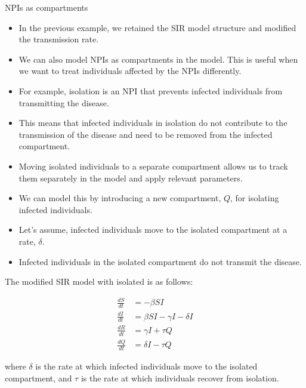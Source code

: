 \documentclass[
  ignorenonframetext,
]{beamer}
\begin{document}
\begin{frame}
\begin{block}{NPIs as compartments}
\label{npis-as-compartments}
\begin{itemize}
\item
  In the previous example, we retained the SIR model structure and
  modified the transmission rate.
\item
  We can also model NPIs as compartments in the model. This is useful
  when we want to treat individuals affected by the NPIs differently.
\end{itemize}
\end{block}
\end{frame}

\begin{frame}
\begin{itemize}
\item
  For example, isolation is an NPI that prevents infected individuals
  from transmitting the disease.
\item
  This means that infected individuals in isolation do not contribute to
  the transmission of the disease and need to be removed from the
  infected compartment.
\item
  Moving isolated individuals to a separate compartment allows us to
  track them separately in the model and apply relevant parameters.
\end{itemize}
\end{frame}

\begin{frame}
\begin{itemize}
\item
  We can model this by introducing a new compartment, \(Q\), for
  isolating infected individuals.
\item
  Let's assume, infected individuals move to the isolated compartment at
  a rate, \(\delta\).
\item
  Infected individuals in the isolated compartment do not transmit the
  disease.
\end{itemize}
\end{frame}

\begin{frame}
The modified SIR model with isolated is as follows:

\begin{align*}
\frac{dS}{dt} & = -\beta S I \\
\frac{dI}{dt} & = \beta S I - \gamma I - \delta I \\
\frac{dR}{dt} & = \gamma I + \tau Q \\
\frac{dQ}{dt} & = \delta I - \tau Q
\end{align*}

where \(\delta\) is the rate at which infected individuals move to the
isolated compartment, and \(\tau\) is the rate at which individuals
recover from isolation.
\end{frame}
\end{document}
